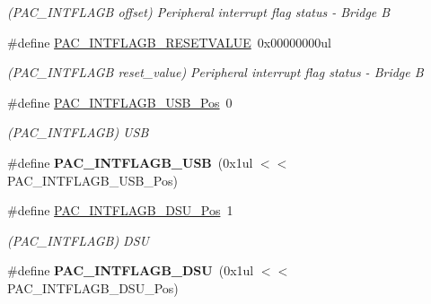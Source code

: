 \begin{DoxyCompactItemize}
\begin{DoxyCompactList}\small\item\em (P\+A\+C\+\_\+\+I\+N\+T\+F\+L\+A\+G\+B offset) Peripheral interrupt flag status -\/ Bridge B \end{DoxyCompactList}\item 
\hypertarget{group___s_a_m_l21___p_a_c_ga565a30045293eefff3bffdf0772e38b2}{}\#define \hyperlink{group___s_a_m_l21___p_a_c_ga565a30045293eefff3bffdf0772e38b2}{P\+A\+C\+\_\+\+I\+N\+T\+F\+L\+A\+G\+B\+\_\+\+R\+E\+S\+E\+T\+V\+A\+L\+U\+E}~0x00000000ul\label{group___s_a_m_l21___p_a_c_ga565a30045293eefff3bffdf0772e38b2}

\begin{DoxyCompactList}\small\item\em (P\+A\+C\+\_\+\+I\+N\+T\+F\+L\+A\+G\+B reset\+\_\+value) Peripheral interrupt flag status -\/ Bridge B \end{DoxyCompactList}\item 
\hypertarget{group___s_a_m_l21___p_a_c_ga518b16d2f73cb68cd1553e57d99592d3}{}\#define \hyperlink{group___s_a_m_l21___p_a_c_ga518b16d2f73cb68cd1553e57d99592d3}{P\+A\+C\+\_\+\+I\+N\+T\+F\+L\+A\+G\+B\+\_\+\+U\+S\+B\+\_\+\+Pos}~0\label{group___s_a_m_l21___p_a_c_ga518b16d2f73cb68cd1553e57d99592d3}

\begin{DoxyCompactList}\small\item\em (P\+A\+C\+\_\+\+I\+N\+T\+F\+L\+A\+G\+B) U\+S\+B \end{DoxyCompactList}\item 
\hypertarget{group___s_a_m_l21___p_a_c_gafb3810336735cb88651aa66268080f65}{}\#define {\bfseries P\+A\+C\+\_\+\+I\+N\+T\+F\+L\+A\+G\+B\+\_\+\+U\+S\+B}~(0x1ul $<$$<$ P\+A\+C\+\_\+\+I\+N\+T\+F\+L\+A\+G\+B\+\_\+\+U\+S\+B\+\_\+\+Pos)\label{group___s_a_m_l21___p_a_c_gafb3810336735cb88651aa66268080f65}

\item 
\hypertarget{group___s_a_m_l21___p_a_c_gaf37fe8fcd3be26d9a958db2acf1f6ec2}{}\#define \hyperlink{group___s_a_m_l21___p_a_c_gaf37fe8fcd3be26d9a958db2acf1f6ec2}{P\+A\+C\+\_\+\+I\+N\+T\+F\+L\+A\+G\+B\+\_\+\+D\+S\+U\+\_\+\+Pos}~1\label{group___s_a_m_l21___p_a_c_gaf37fe8fcd3be26d9a958db2acf1f6ec2}

\begin{DoxyCompactList}\small\item\em (P\+A\+C\+\_\+\+I\+N\+T\+F\+L\+A\+G\+B) D\+S\+U \end{DoxyCompactList}\item 
\hypertarget{group___s_a_m_l21___p_a_c_ga6684561270bf657d4ba82facc781ae27}{}\#define {\bfseries P\+A\+C\+\_\+\+I\+N\+T\+F\+L\+A\+G\+B\+\_\+\+D\+S\+U}~(0x1ul $<$$<$ P\+A\+C\+\_\+\+I\+N\+T\+F\+L\+A\+G\+B\+\_\+\+D\+S\+U\+\_\+\+Pos)\label{group___s_a_m_l21___p_a_c_ga6684561270bf657d4ba82facc781ae27}


\end{DoxyCompactItemize}
